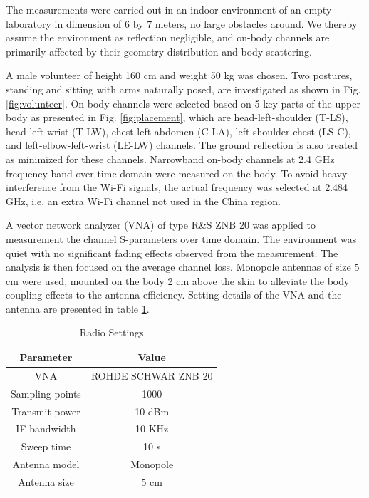 \documentclass[conference]{IEEEtran}
\begin{document}
The measurements were carried out in an indoor environment of an empty laboratory in dimension of 6 by 7 meters, no large obstacles around. We thereby assume the environment as reflection negligible, and on-body channels are primarily affected by their geometry distribution and body scattering.

A male volunteer of height 160 cm and weight 50 kg was chosen. Two postures, standing and sitting with arms naturally posed, are investigated as shown in Fig. \ref{fig:volunteer}. On-body channels were selected based on 5 key parts of the upper-body as presented in Fig. \ref{fig:placement}, which are head-left-shoulder (T-LS), head-left-wrist (T-LW), chest-left-abdomen (C-LA), left-shoulder-chest (LS-C), and left-elbow-left-wrist (LE-LW) channels. The ground reflection is also treated as minimized for these channels. Narrowband on-body channels at 2.4 GHz frequency band over time domain were measured on the body. To avoid heavy interference from the Wi-Fi signals, the actual frequency was selected at 2.484 GHz, i.e. an extra Wi-Fi channel not used in the China region.

A vector network analyzer (VNA) of type R\&S ZNB 20 was applied to measurement the channel S-parameters over time domain. The environment was quiet with no significant fading effects observed from the measurement. The analysis is then focused on the average channel loss. Monopole antennas of size 5 cm were used, mounted on the body 2 cm above the skin to alleviate the body coupling effects to the antenna efficiency. Setting details of the VNA and the antenna are presented in table \ref{tab:1}.

\begin{table}[!t]
\centering
\captionsetup{labelsep=newline}
\caption{Radio Settings}
\label{tab:1}
\begin{tabular}{cc}
\hline
Parameter&Value\\
\hline
VNA&ROHDE SCHWAR ZNB 20\\
Sampling points&1000\\
Transmit power&10 dBm\\
IF bandwidth&10 KHz\\
Sweep time&10 s\\
\hline
Antenna model&Monopole\\
Antenna size&5 cm\\
\hline
\end{tabular}
\end{table}
\end{document}
